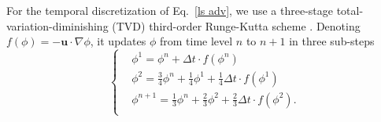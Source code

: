\sloppy
For the temporal discretization of Eq.\ \eqref{ls adv}, we use a three-stage total-variation-diminishing (TVD) third-order Runge-Kutta scheme \cite{Shu_JCP_1988}. Denoting $f(\phi)=-{\bm u} \cdot \nabla \phi$, it updates $\phi$ from time level $n$ to $n+1$ in three sub-steps
\begin{equation}
  \begin{cases}
    & \phi^1 = \phi^n + \Delta t \cdot f(\phi^n)  \\
    & \phi^2 = \frac{3}{4} \phi^n + \frac{1}{4} \phi^1 + \frac{1}{4} \Delta t \cdot f(\phi^1) \\
    & \phi^{n+1} = \frac{1}{3} \phi^n + \frac{2}{3} \phi^2 + \frac{2}{3} \Delta t \cdot f(\phi^2). \\
  \end{cases}
  \label{SSP-RK3}
\end{equation}

